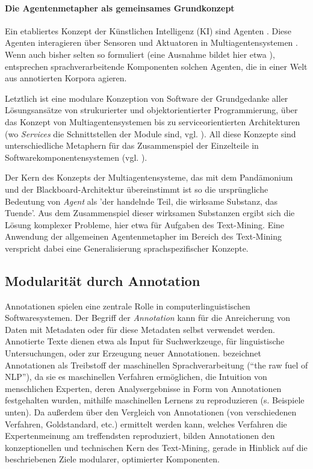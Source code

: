 \documentclass[abstracton, 12pt]{scrartcl}
\begin{document}
\paragraph{Die Agentenmetapher als gemeinsames Grundkonzept} 

Ein etabliertes Konzept der Künst\-lich\-en Intelligenz (KI) sind Agenten \citep{RussellAndNorvig2003}. Diese Agenten interagieren über Sensoren und Aktuatoren in Multiagentensystemen \citep{Vlassis2003,Lin2007}. Wenn auch bisher selten so formuliert (eine Ausnahme bildet hier etwa \citealt{YuEtAl2008}), entsprechen sprachverarbeitende Komponenten solchen Agenten, die in einer Welt aus annotierten Korpora agieren.

Letztlich ist eine modulare Konzeption von Software der Grundgedanke aller Lösungsansätze von strukurierter \citep{Dijkstra1968,Wirth1971,DahlEtAl1972} und objektorientierter Programmierung, über das Konzept von Multiagentensystemen bis zu serviceorientierten Architekturen (wo \emph{Services} die Schnittstellen der Module sind, vgl. \citealt{GruhnAndThiel2000}). All diese Konzepte sind unterschiedliche Metaphern für das Zusammenspiel der Einzelteile in Softwarekomponentensystemen (vgl. \citealt{Corkill2003}).

Der Kern des Konzepts der Multiagentensysteme, das mit dem Pandämonium und der Black\-board-Architektur übereinstimmt ist so die ursprüngliche Bedeutung von \emph{Agent} als 'der handelnde Teil, die wirksame Substanz, das Tuende'. Aus dem Zusammenspiel dieser wirksamen Substanzen ergibt sich die Lösung komplexer Probleme, hier etwa für Aufgaben des Text-Mining. Eine Anwendung der allgemeinen Agentenmetapher im Bereich des Text-Mining verspricht dabei eine  Generalisierung sprachspezifischer Konzepte.

\subsection{Modularität durch Annotation} \label{anno-theorie} 

Annotationen spielen eine zentrale Rolle in computerlinguistischen Softwaresystemen. Der Begriff der \emph{Annotation} kann  für die Anreicherung von Daten mit Metadaten oder für diese Metadaten selbst verwendet werden. Annotierte Texte dienen etwa als Input für Suchwerkzeuge, für linguistische Untersuchungen, oder zur Erzeugung neuer Annotationen. \citet[448]{McEnery2003} bezeichnet Annotationen als Treibstoff der maschinellen Sprachverarbeitung (``the raw fuel of NLP''), da sie es maschinellen Verfahren ermöglichen, die Intuition von menschlichen Experten, deren Analysergebnisse in Form von Annotationen festgehalten wurden, mithilfe maschinellen Lernens zu reproduzieren (s. Beispiele unten). Da außerdem über den Vergleich von Annotationen (von verschiedenen Verfahren, Goldstandard, etc.) ermittelt werden kann, welches Verfahren die Expertenmeinung am treffendsten reproduziert, bilden Annotationen den konzeptionellen und technischen Kern des Text-Mining, gerade in Hinblick auf die beschriebenen Ziele modularer, optimierter Komponenten.
\end{document}
